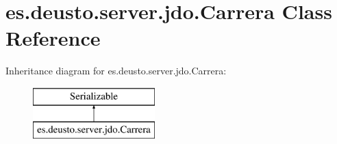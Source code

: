 \hypertarget{classes_1_1deusto_1_1server_1_1jdo_1_1_carrera}{}\section{es.\+deusto.\+server.\+jdo.\+Carrera Class Reference}
\label{classes_1_1deusto_1_1server_1_1jdo_1_1_carrera}
Inheritance diagram for es.\+deusto.\+server.\+jdo.\+Carrera\+:\begin{figure}[H]
\begin{center}
\leavevmode
\includegraphics[height=2.000000cm]{classes_1_1deusto_1_1server_1_1jdo_1_1_carrera}
\end{center}
\end{figure}
